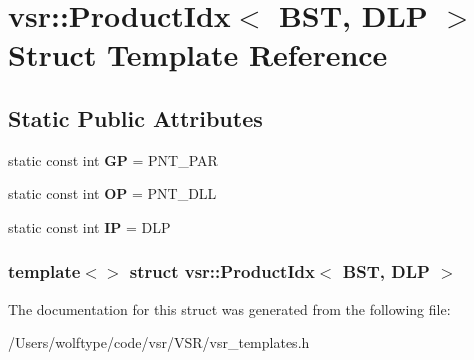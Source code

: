 \hypertarget{structvsr_1_1_product_idx_3_01_b_s_t_00_01_d_l_p_01_4}{\section{vsr\-:\-:Product\-Idx$<$ B\-S\-T, D\-L\-P $>$ Struct Template Reference}
\label{structvsr_1_1_product_idx_3_01_b_s_t_00_01_d_l_p_01_4}
}
\subsection*{Static Public Attributes}
\begin{DoxyCompactItemize}
\item 
\hypertarget{structvsr_1_1_product_idx_3_01_b_s_t_00_01_d_l_p_01_4_a8f51643614a608e84236c792ff8d64eb}{static const int {\bfseries G\-P} = P\-N\-T\-\_\-\-P\-A\-R}\label{structvsr_1_1_product_idx_3_01_b_s_t_00_01_d_l_p_01_4_a8f51643614a608e84236c792ff8d64eb}

\item 
\hypertarget{structvsr_1_1_product_idx_3_01_b_s_t_00_01_d_l_p_01_4_a4cef2c2f5db9fc612ed2617c74d6695c}{static const int {\bfseries O\-P} = P\-N\-T\-\_\-\-D\-L\-L}\label{structvsr_1_1_product_idx_3_01_b_s_t_00_01_d_l_p_01_4_a4cef2c2f5db9fc612ed2617c74d6695c}

\item 
\hypertarget{structvsr_1_1_product_idx_3_01_b_s_t_00_01_d_l_p_01_4_a5d9995c21551ea2e8b48e1339bddf863}{static const int {\bfseries I\-P} = D\-L\-P}\label{structvsr_1_1_product_idx_3_01_b_s_t_00_01_d_l_p_01_4_a5d9995c21551ea2e8b48e1339bddf863}

\end{DoxyCompactItemize}
\subsubsection*{template$<$$>$ struct vsr\-::\-Product\-Idx$<$ B\-S\-T, D\-L\-P $>$}



The documentation for this struct was generated from the following file\-:\begin{DoxyCompactItemize}
\item 
/\-Users/wolftype/code/vsr/\-V\-S\-R/vsr\-\_\-templates.\-h\end{DoxyCompactItemize}
